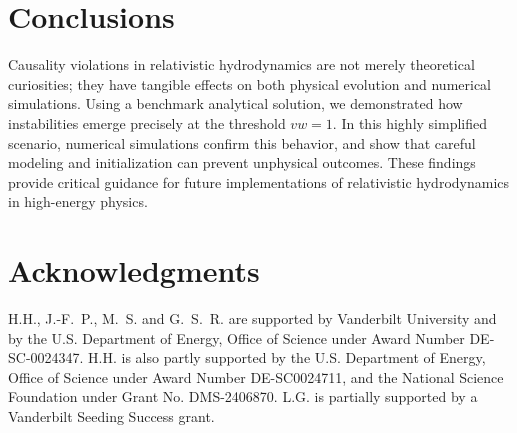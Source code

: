 \documentclass{webofc}
\begin{document}
\section{Conclusions}

Causality violations in relativistic hydrodynamics are not merely theoretical curiosities; they have tangible effects on both physical evolution and numerical simulations. Using a benchmark analytical solution, we demonstrated how instabilities emerge precisely at the threshold \( v w = 1 \). In this highly simplified scenario, numerical simulations confirm this behavior, and show that careful modeling and initialization can prevent unphysical outcomes. These findings provide critical guidance for future implementations of relativistic hydrodynamics in high-energy physics.

\section*{Acknowledgments}

H.H., J.-F.~P., M.~S. and G.~S.~R. are supported by Vanderbilt University and by the U.S. Department of Energy, Office of Science under Award Number DE-SC-0024347.
H.H. is also partly supported by the U.S. Department of Energy, Office of Science under Award Number DE-SC0024711, and the National Science Foundation under Grant No. DMS-2406870. L.G. is partially supported by a Vanderbilt Seeding Success grant. 



\label{lastpage}
\end{document}
